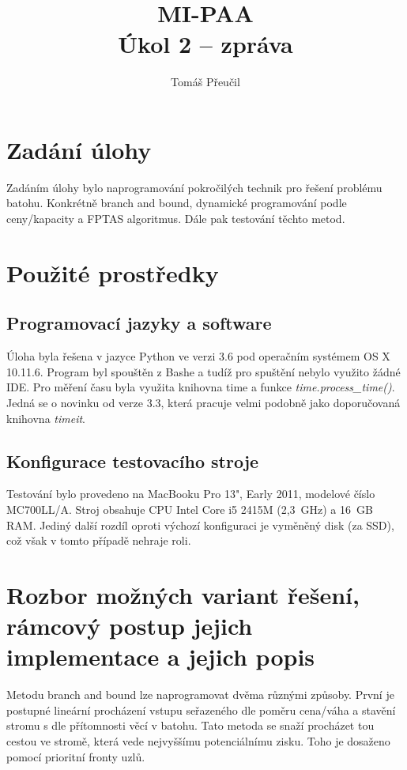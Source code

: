 \documentclass[a4paper]{article}
\title{MI-PAA\\
\large Úkol 2 -- zpráva\\}
\author{Tomáš Přeučil}
\begin{document}
\maketitle


\section{Zadání úlohy}
	Zadáním úlohy bylo naprogramování pokročilých technik pro řešení problému batohu. Konkrétně branch and bound, dynamické programování podle ceny/kapacity a FPTAS algoritmus. Dále pak testování těchto metod.


\section{Použité prostředky}
	\subsection{Programovací jazyky a software}
		Úloha byla řešena v jazyce Python ve verzi 3.6 pod operačním systémem OS X 10.11.6. Program byl spouštěn z Bashe a tudíž pro spuštění nebylo využito žádné IDE.
		Pro měření času byla využita knihovna time a funkce \textit{time.process\_time()}. Jedná se o novinku od verze 3.3, která pracuje velmi podobně jako doporučovaná knihovna \textit{timeit}.
		
	\subsection{Konfigurace testovacího stroje}
		Testování bylo provedeno na MacBooku Pro 13", Early 2011, modelové číslo MC700LL/A. Stroj obsahuje CPU Intel Core i5 2415M (2,3~GHz) a 16~GB RAM. Jediný další rozdíl oproti výchozí konfiguraci je vyměněný disk (za SSD), což však v tomto případě nehraje roli.

\section{Rozbor možných variant řešení, rámcový postup jejich implementace a jejich popis}
	Metodu branch and bound lze naprogramovat dvěma různými způsoby. První je postupné lineární procházení vstupu seřazeného dle poměru cena/váha a stavění stromu s dle přítomnosti věcí v batohu. Tato metoda se snaží procházet tou cestou ve stromě, která vede nejvyššímu potenciálnímu zisku. Toho je dosaženo pomocí prioritní fronty uzlů.
	
\end{document}

